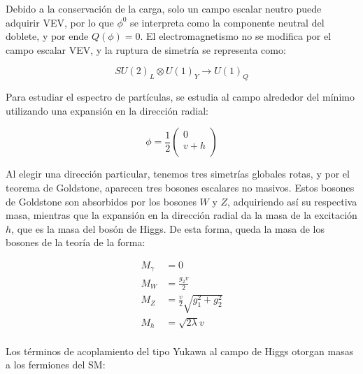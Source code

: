 Debido a la conservación de la carga, solo un campo escalar neutro puede adquirir VEV, por lo que $\phi^0$ se interpreta como la componente neutral del doblete, 
y por ende $Q(\phi)=0$. El electromagnetismo no se modifica por el campo escalar VEV, y la ruptura de simetría se representa como:

\begin{equation}
SU(2)_L \otimes U(1)_Y \rightarrow U(1)_Q
\end{equation}

Para estudiar el espectro de partículas, se estudia al campo alrededor del mínimo utilizando una expansión en la dirección radial:

\begin{equation}
	\phi = \frac{1}{2}
	\begin{pmatrix}
	0 \\
	v + h \\
	\end{pmatrix}
\end{equation}

Al elegir una dirección particular, tenemos tres simetrías globales rotas, y por el teorema de Goldstone, aparecen tres bosones escalares no masivos. Estos bosones de Goldstone son absorbidos por los bosones $W$ y $Z$, adquiriendo así su respectiva masa, 
mientras que la expansión en la dirección radial da la masa de la excitación $h$, que es la masa del bosón de Higgs. De esta forma, queda la masa de los bosones de la teoría de la forma:

\begin{equation}
\begin{split}
	M_{\gamma} & = 0 \\
	M_{W} & = \frac{g_2 v}{2} \\
	M_{Z} & = \frac{v}{2}\sqrt{g_1^2 + g_2^2} \\
	M_{h} & = \sqrt{2\lambda}v \\
\end{split}
\end{equation}

Los términos de acoplamiento del tipo Yukawa al campo de Higgs otorgan masas a los fermiones del SM:

